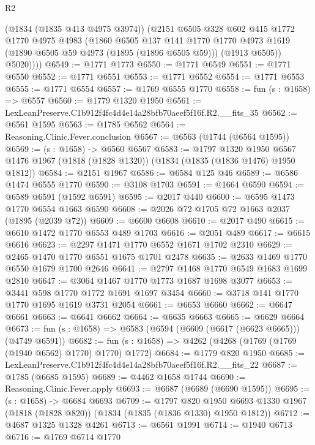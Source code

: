 \begin{lexlean}{R2}
\begin{coremodule}
          (@1834 (@1835 @413 @4975 @3974))
          (@2151
            @6505
            @328
            @602
            @415
            @1772
            @1770
            @4975
            @4983
            (@1860
              @6505
              @137
              @141
              @1770
              @1770
              @4973
              @1619
              (@1890 @6505 @59 @4973 (@1895 (@1896 @6505 @59)))
              (@1913 @6505))
            @5020))))
@6549 := @1771 @1773
@6550 := @1771 @6549
@6551 := @1771 @6550
@6552 := @1771 @6551
@6553 := @1771 @6552
@6554 := @1771 @6553
@6555 := @1771 @6554
@6557 := @1769 @6555 @1770
@6558 := fun (s : @1658) => @6557
@6560 := @1779 @1320 @1950
@6561 := LexLeanPreserve.C1b912f4fc4d4e14a28bfb70aeef5f16f.R2.__fits_35
@6562 := @6561 @1595
@6563 := @1785 @6562
@6564 := Reasoning.Clinic.Fever.conclusion
@6567 := @6563 (@1744 (@6564 @1595))
@6569 := (s : @1658) -> @6560 @6567
@6583 := @1797
    @1320
    @1950
    @6567
    @1476
    @1967
    (@1818 (@1828 @1320))
    (@1834 (@1835 (@1836 @1476) @1950 @1812))
@6584 := @2151 @1967
@6586 := @6584 @125 @46
@6589 := @6586 @1474 @6555 @1770
@6590 := @3108 @1703
@6591 := @1664 @6590
@6594 := @6589 @6591 (@1592 @6591)
@6595 := @2017 @440
@6600 := @6595 @1473 @1770 @6554 @1663 @6590
@6608 := @2026 @72 @1705 @72 @1663 @2037 (@1895 (@2039 @72))
@6609 := @6600 @6608
@6610 := @2017 @490
@6615 := @6610 @1472 @1770 @6553 @489 @1703
@6616 := @2051 @489
@6617 := @6615 @6616
@6623 := @2297 @1471 @1770 @6552 @1671 @1702 @2310
@6629 := @2465 @1470 @1770 @6551 @1675 @1701 @2478
@6635 := @2633 @1469 @1770 @6550 @1679 @1700 @2646
@6641 := @2797 @1468 @1770 @6549 @1683 @1699 @2810
@6647 := @3064 @1467 @1770 @1773 @1687 @1698 @3077
@6653 := @3441 @598 @1770 @1772 @1691 @1697 @3454
@6660 := @3718 @141 @1770 @1770 @1695 @1619 @3731 @2054
@6661 := @6653 @6660
@6662 := @6647 @6661
@6663 := @6641 @6662
@6664 := @6635 @6663
@6665 := @6629 @6664
@6673 := fun (s : @1658) => @6583 (@6594 (@6609 (@6617 (@6623 @6665))) (@4749 @6591))
@6682 := fun (s : @1658) => @4262 (@4268 (@1769 (@1769 (@1940 @6562) @1770) @1770) @1772)
@6684 := @1779 @820 @1950
@6685 := LexLeanPreserve.C1b912f4fc4d4e14a28bfb70aeef5f16f.R2.__fits_22
@6687 := @1785 (@6685 @1595)
@6689 := @4462 @1658 @1744
@6690 := Reasoning.Clinic.Fever.apply
@6693 := @6687 (@6689 (@6690 @1595))
@6695 := (s : @1658) -> @6684 @6693
@6709 := @1797
    @820
    @1950
    @6693
    @1330
    @1967
    (@1818 (@1828 @820))
    (@1834 (@1835 (@1836 @1330) @1950 @1812))
@6712 := @4687 @1325 @1328 @4261
@6713 := @6561 @1991
@6714 := @1940 @6713
@6716 := @1769 @6714 @1770

\end{coremodule}
\end{lexlean}
